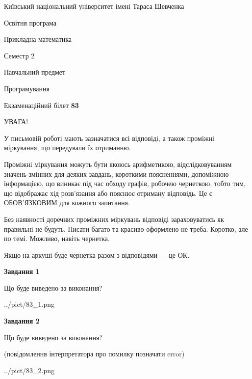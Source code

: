 \documentclass[12pt, ukrainian]{article}
\begin{document}
{{\begin {small}\par
{ \center  Київський національний університет імені Тараса Шевченка \par}
{\parbox {5 cm}{Освітня програма \hfill}{\parbox {7 cm}{Прикладна математика\hfill}}\parbox {6 cm}{\hfill Семестр 2}}\par
{\parbox {5 cm} {Навчальний предмет \hfill}\parbox {7 cm}{Програмування \hfill}\parbox {6cm}{\hfill}\par}\vspace{-7pt} \end{small}}{\center Екзаменаційний білет \No \textbf
{ 83 }\par}}
{
\begin {large}
УВАГА!

У письмовій роботі мають зазначатися всі відповіді, а також проміжні міркування, що передували їх отриманню.

Проміжні міркування можуть бути якоюсь арифметикою, відслідковуванням зна\-чень змінних для деяких завдань,
короткими поясненнями, допоміжною інформацією, що виникає під час обходу графів, робочею чернеткою,
тобто тим, що відображає хід розв’язання або пояснює отриману відповідь.
Це є ОБОВ’ЯЗКОВИМ для кожного запитання.

Без наявності доречних проміжних міркувань відповіді зараховуватись як правиль\-ні не будуть.
Писати багато та красиво оформлено не треба. Коротко, але по темі. Можли\-во, навіть чернетка.

Якщо на аркуші буде чернетка разом з відповідями --- це ОК.

\newpage

{\begin {center}\textbf{Завдання 1}\end {center}}\par
Що буде виведено за виконання?\par
\begin{center}
	{../pict/83_1.png}
\end{center}
\newpage

{\begin {center}\textbf{Завдання 2}\end {center}}\par
Що буде виведено за виконання?\par
 (повідомлення інтерпретатора про помилку позначати error)\par
\begin{center}
	{../pict/83_2.png}
\end{center}
\newpage


\end{large}}
\end{document}
